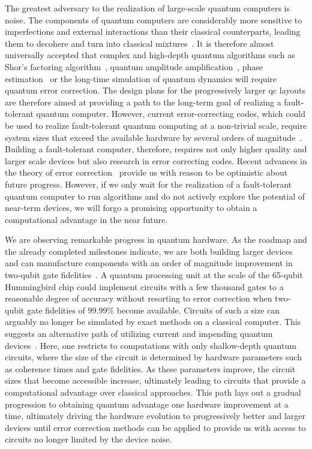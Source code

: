 The greatest adversary to the realization of large-scale quantum computers is noise. The components of quantum computers are considerably more sensitive to imperfections and external interactions than their classical counterparts, leading them to decohere and turn into classical mixtures~\cite{unruh1995maintaining}. It is therefore almost universally accepted that complex and high-depth quantum algorithms such as Shor's factoring algorithm~\cite{shor1994algorithms}, quantum amplitude amplification~\cite{brassard1997exact,grover1998quantum}, phase estimation~\cite{kitaev1995quantum} or the long-time simulation of quantum dynamics will require quantum error correction. The design plans for the progressively larger \gls{qc} layouts are therefore aimed at providing a path to the long-term goal of realizing a fault-tolerant quantum computer. However, current error-correcting codes, which could be used to realize fault-tolerant quantum computing at a non-trivial scale, require system sizes that exceed the available hardware by several orders of magnitude~\cite{gidney2021factor,lee2021even}. Building a fault-tolerant computer, therefore, requires not only higher quality and larger scale devices but also research in error correcting codes. Recent advances in the theory of error correction~\cite{breuckmann2021quantum} provide us with reason to be optimistic about future progress. However, if we only wait for the realization of a fault-tolerant quantum computer to run algorithms and do not actively explore the potential of near-term devices, we will forgo a promising opportunity to obtain a computational advantage in the near future.

We are observing remarkable progress in quantum hardware. As the roadmap and the already completed milestones indicate, we are both building larger devices and can manufacture components with an order of magnitude improvement in two-qubit gate fidelities~\cite{Stehlik2021}. A quantum processing unit at the scale of the 65-qubit Hummingbird chip could implement circuits with a few thousand gates to a reasonable degree of accuracy without resorting to error correction when two-qubit gate fidelities of $99.99\%$ become available. Circuits of such a size can arguably no longer be simulated by exact methods on a classical computer. This suggests an alternative path of utilizing current and impending quantum devices~\cite{path_error_mit}. Here, one restricts to computations with only shallow-depth quantum circuits, where the size of the circuit is determined by hardware parameters such as coherence times and gate fidelities. As these parameters improve, the circuit sizes that become accessible increase, ultimately leading to circuits that provide a computational advantage over classical approaches. This path lays out a gradual progression to obtaining quantum advantage one hardware improvement at a time, ultimately driving the hardware evolution to progressively better and larger devices until error correction methods can be applied to provide us with access to circuits no longer limited by the device noise.

